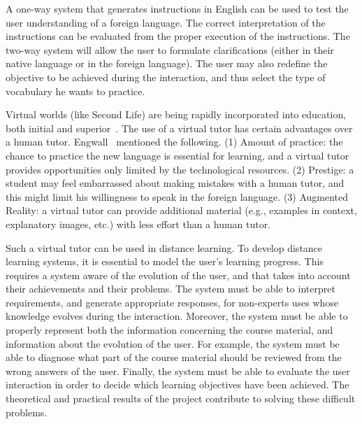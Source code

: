 A one-way system that generates instructions in English can be used to test the
user understanding of a foreign language. The correct interpretation of the
instructions can be evaluated from the proper execution of the instructions. The
two-way system will allow the user to formulate clarifications (either in their
native language or in the foreign language). The user may also redefine the
objective to be achieved during the interaction, and thus select the type of
vocabulary he wants to practice.

Virtual worlds (like Second Life) are being rapidly incorporated into
education, both initial and superior~\cite{Doswell05,molk:lear09}. The use of a
virtual tutor has certain advantages over a human tutor.
Engwall~ mentioned the following. (1) Amount of
practice: the chance to practice the new language is essential for learning, and
a virtual tutor provides opportunities only limited by the
technological resources. (2) Prestige: a student
may feel embarrassed about making mistakes with a human tutor, and this
might limit his willingness to speak in the foreign language. (3) Augmented
Reality: a virtual
tutor can provide additional material (e.g., examples in context, explanatory
images, etc.) with less effort than a human tutor.


Such a virtual tutor can be used in distance learning. To develop distance learning systems, it is essential to model the user's learning
progress. This requires a system aware of the evolution of the
user, and that takes into account their achievements and their problems. 
 The system must be able to interpret requirements, and generate
appropriate responses, for non-experts uses whose knowledge evolves during the
interaction. Moreover, the system must be able to properly represent both the
information concerning the course material, and information about the
evolution of the user. For example, the system must be able to diagnose what
part of the course material should be reviewed from the wrong answers of the
user. Finally, the system must be able to evaluate the user interaction in order
to decide which learning objectives have been achieved. The theoretical and practical
results of the project contribute to solving these difficult
problems.








